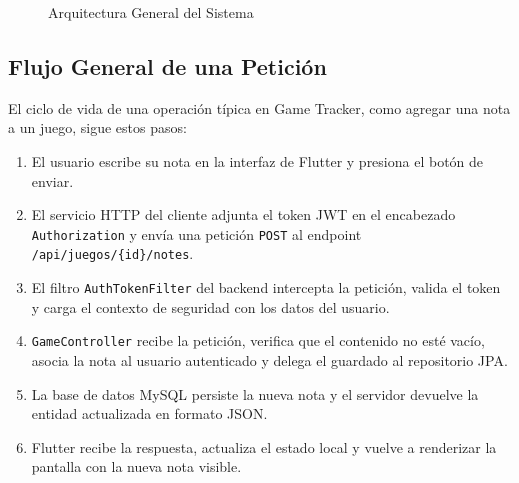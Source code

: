 \begin{figure}[H]
    \centering
    \caption{Arquitectura General del Sistema}
\end{figure}

\subsection{Flujo General de una Petición}

El ciclo de vida de una operación típica en Game Tracker, como agregar una
nota a un juego, sigue estos pasos:

\begin{enumerate}
    \item El usuario escribe su nota en la interfaz de Flutter y presiona
    el botón de enviar.
    \item El servicio HTTP del cliente adjunta el token JWT en el encabezado
    \texttt{Authorization} y envía una petición \texttt{POST} al endpoint
    \texttt{/api/juegos/\{id\}/notes}.
    \item El filtro \texttt{AuthTokenFilter} del backend intercepta la petición,
    valida el token y carga el contexto de seguridad con los datos del usuario.
    \item \texttt{GameController} recibe la petición, verifica que el contenido
    no esté vacío, asocia la nota al usuario autenticado y delega el guardado
    al repositorio JPA.
    \item La base de datos MySQL persiste la nueva nota y el servidor devuelve
    la entidad actualizada en formato JSON.
    \item Flutter recibe la respuesta, actualiza el estado local y vuelve a
    renderizar la pantalla con la nueva nota visible.
\end{enumerate}

